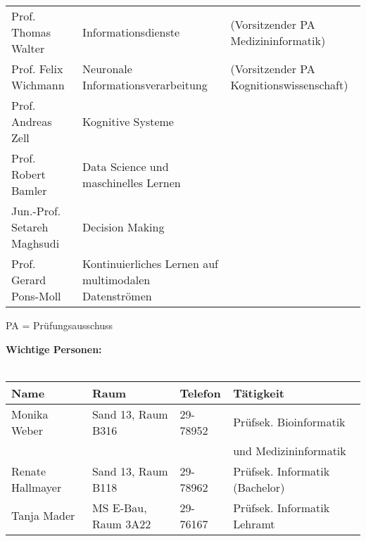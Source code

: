 \begin{tabular}{|lll|}
	Prof. Thomas Walter              & Informationsdienste                                   & (Vorsitzender PA Medizininformatik)      \\
	Prof. Felix Wichmann             & Neuronale Informationsverarbeitung                    & (Vorsitzender PA Kognitionswissenschaft) \\
	Prof. Andreas Zell               & Kognitive Systeme                                     &                                          \\
	Prof. Robert Bamler              & Data Science und maschinelles Lernen                  &                                          \\
	Jun.-Prof. Setareh Maghsudi      & Decision Making                                       &                                          \\
	Prof. Gerard Pons-Moll           & Kontinuierliches Lernen auf multimodalen Datenströmen &                                          \\

	\hline
\end{tabular}
\scriptsize{PA = Prüfungsausschuss}


\textbf{Wichtige Personen:}\\\\
\begin{tabular}{|llll|}
	\hline
	Name             & Raum                & Telefon  & Tätigkeit \hfill               \\
	\hline
	\hline
	Monika Weber     & Sand 13, Raum B316  & 29-78952 & Prüfsek. Bioinformatik         \\
	                 &                     &          & und Medizininformatik          \\
	Renate Hallmayer & Sand 13, Raum B118  & 29-78962 & Prüfsek. Informatik (Bachelor) \\
	Tanja Mader      & MS E-Bau, Raum 3A22 & 29-76167 & Prüfsek. Informatik Lehramt    \\
	\hline
\end{tabular} \\

